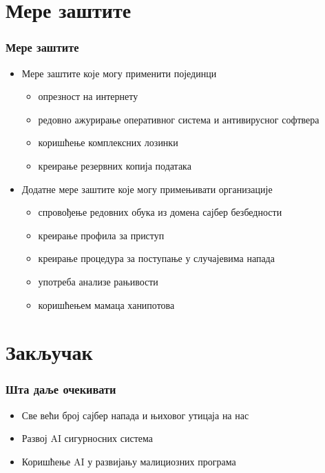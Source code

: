 \documentclass{beamer}
\begin{document}
\section{Мере заштите}

\begin{frame}[fragile]\frametitle{Мере заштите}
	\begin{itemize}	
	\item Мере заштите које могу применити појединци
		\begin{itemize}
		\item опрезност на интернету
		\item редовно ажурирање оперативног система и антивирусног софтвера
		\item коришћење комплексних лозинки
		\item креирање резервних копија података
	\end{itemize}
	\item Додатне мере заштите које могу примењивати организације
	\begin{itemize}
		\item спровођење редовних обука из домена сајбер безбедности 
		\item креирање профила за приступ
		\item креирање процедура за поступање у случајевима напада
		\item употреба анализе рањивости
		\item коришћењем мамаца ханипотова
	\end{itemize}
	\end{itemize}
\end{frame}
\section{Закључак}
	\begin{frame}\frametitle{Шта даље очекивати}
		\begin{itemize}
			\item Све већи број сајбер напада и њиховог утицаја на нас
			\item Развој AI сигурносних система
			\item Коришћење AI у развијању малициозних програма
		\end{itemize}
	\end{frame}
\end{document}
